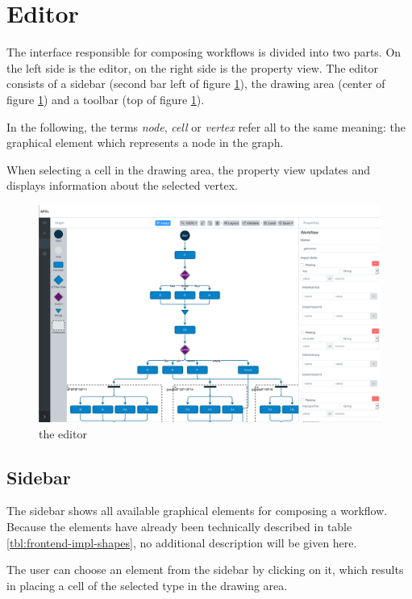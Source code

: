 \documentclass[a4paper,12pt,pdftex,halfparskip,cleardoubleempty,bibtotoc,liststotoc]{scrbook}
\begin{document}
\section{Editor}
The interface responsible for composing workflows is divided into two parts. On the left side is the editor, on the right side is the property view. The editor consists of a sidebar (second bar left of figure \ref{fig:editor}), the drawing area (center of figure \ref{fig:editor}) and a toolbar (top of figure \ref{fig:editor}).

In the following, the terms \textit{node}, \textit{cell} or \textit{vertex} refer all to the same meaning: the graphical element which represents a node in the graph.

When selecting a cell in the drawing area, the property view updates and displays information about the selected vertex.

\begin{figure}[H]
  \centering
  \includegraphics[width=\textwidth]{editor}
  \caption{the editor}
  \label{fig:editor}
\end{figure}

\subsection{Sidebar}

The sidebar shows all available graphical elements for composing a workflow. Because the elements have already been technically described in table \ref{tbl:frontend-impl-shapes}, no additional description will be given here.

The user can choose an element from the sidebar by clicking on it, which results in placing a cell of the selected type in the drawing area.
\end{document}
